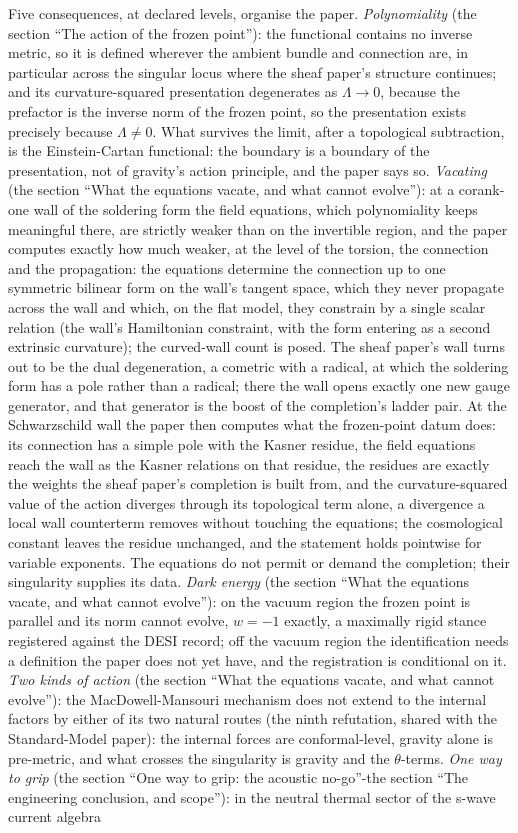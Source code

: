 \documentclass[11pt]{article}
\theoremstyle{definition}
\theoremstyle{plain}
\begin{document}
Five consequences, at declared levels, organise the paper. \emph{Polynomiality} (the section ``The action of the frozen point''): the functional contains no inverse metric, so it is defined wherever the ambient bundle and connection are, in particular across the singular locus where the sheaf paper's structure continues; and its curvature-squared presentation degenerates as $\Lambda \to 0$, because the prefactor is the inverse norm of the frozen point, so the presentation exists precisely because $\Lambda \neq 0$. What survives the limit, after a topological subtraction, is the Einstein-Cartan functional: the boundary is a boundary of the presentation, not of gravity's action principle, and the paper says so. \emph{Vacating} (the section ``What the equations vacate, and what cannot evolve''): at a corank-one wall of the soldering form the field equations, which polynomiality keeps meaningful there, are strictly weaker than on the invertible region, and the paper computes exactly how much weaker, at the level of the torsion, the connection and the propagation: the equations determine the connection up to one symmetric bilinear form on the wall's tangent space, which they never propagate across the wall and which, on the flat model, they constrain by a single scalar relation (the wall's Hamiltonian constraint, with the form entering as a second extrinsic curvature); the curved-wall count is posed. The sheaf paper's wall turns out to be the dual degeneration, a cometric with a radical, at which the soldering form has a pole rather than a radical; there the wall opens exactly one new gauge generator, and that generator is the boost of the completion's ladder pair. At the Schwarzschild wall the paper then computes what the frozen-point datum does: its connection has a simple pole with the Kasner residue, the field equations reach the wall as the Kasner relations on that residue, the residues are exactly the weights the sheaf paper's completion is built from, and the curvature-squared value of the action diverges through its topological term alone, a divergence a local wall counterterm removes without touching the equations; the cosmological constant leaves the residue unchanged, and the statement holds pointwise for variable exponents. The equations do not permit or demand the completion; their singularity supplies its data. \emph{Dark energy} (the section ``What the equations vacate, and what cannot evolve''): on the vacuum region the frozen point is parallel and its norm cannot evolve, $w = -1$ exactly, a maximally rigid stance registered against the DESI record; off the vacuum region the identification needs a definition the paper does not yet have, and the registration is conditional on it. \emph{Two kinds of action} (the section ``What the equations vacate, and what cannot evolve''): the MacDowell-Mansouri mechanism does not extend to the internal factors by either of its two natural routes (the ninth refutation, shared with the Standard-Model paper): the internal forces are conformal-level, gravity alone is pre-metric, and what crosses the singularity is gravity and the $\theta$-terms. \emph{One way to grip} (the section ``One way to grip: the acoustic no-go''-the section ``The engineering conclusion, and scope''): in the neutral thermal sector of the s-wave current algebra 
\end{document}
